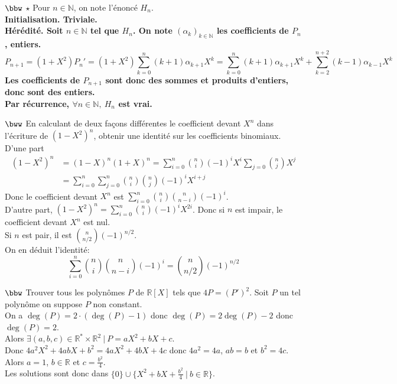 \documentclass[11pt]{article}
\begin{document}
\begin{exercice}{$\bbw$ $\star$}{}
     Pour $n\in\mathbb{N}$, on note l'énoncé $H_n$.\\
    \bf{Initialisation.} Triviale.\\
    \bf{Hérédité.} Soit $n\in\mathbb{N}$ tel que $H_n$. On note $(\alpha_k)_{k\in\mathbb{N}}$ les coefficients de $P_n$, entiers.
    \begin{equation*}P_{n+1}=(1+X^2)P_n'=(1+X^2)\sum\limits_{k=0}^{n}(k+1)\alpha_{k+1}X^{k}=\sum\limits_{k=0}^n(k+1)\alpha_{k+1}X^k+\sum\limits_{k=2}^{n+2}(k-1)\alpha_{k-1}X^{k}\end{equation*}
    Les coefficients de $P_{n+1}$ sont donc des sommes et produits d'entiers, donc sont des entiers.\\
    Par récurrence, $\forall{n\in\mathbb{N}}, ~ H_n$ est vrai.
\end{exercice}

\vspace*{-0.5cm}

\begin{exercice}{$\bww$}{}
    En calculant de deux façons différentes le coefficient devant $X^n$ dans l'écriture de $(1-X^2)^n$, obtenir une identité sur les coefficients binomiaux.
    \tcblower
    D'une part
    \begin{align*}
        (1-X^2)^n &= (1-X)^n(1+X)^n = \sum_{i=0}^n\binom{n}{i}(-1)^iX^i\sum_{j=0}\binom{n}{j}X^j\\
        &=\sum_{i=0}^n\sum_{j=0}^n\binom{n}{i}\binom{n}{j}(-1)^iX^{i+j}
    \end{align*}
    Donc le coefficient devant $X^n$ est $\sum_{i=0}^n\binom{n}{i}\binom{n}{n-i}(-1)^i$.\\
    D'autre part, $(1-X^2)^n=\sum_{i=0}^n\binom{n}{i}(-1)^iX^{2i}$. Donc si $n$ est impair, le coefficient devant $X^n$ est nul.\\
    Si $n$ est pair, il est $\binom{n}{n/2}(-1)^{n/2}$.\\
    On en déduit l'identité: 
    \begin{equation*}
        \sum_{i=0}^n\binom{n}{i}\binom{n}{n-i}(-1)^i=\binom{n}{n/2}(-1)^{n/2}
    \end{equation*}
\end{exercice}

\vspace*{-0.5cm}

\begin{exercice}{$\bbw$}{}
    Trouver tous les polynômes $P$ de $\mathbb{R}[X]$ tels que $4P=(P')^2$.
    \tcblower
    Soit $P$ un tel polynôme on suppose $P$ non constant.\\
    On a $\deg(P)=2\cdot(\deg(P)-1)$ donc $\deg(P)=2\deg(P)-2$ donc $\deg(P)=2$.\\
    Alors $\exists (a,b,c)\in\mathbb{R}^*\times\mathbb{R}^2 ~ | ~ P = aX^2 + bX + c$.\\
    Donc $4a^2X^2 + 4abX + b^2 = 4aX^2 + 4bX + 4c$ donc $4a^2=4a$, $ab = b$ et $b^2=4c$.\\
    Alors $a=1$, $b\in\mathbb{R}$ et $c=\frac{b^2}{4}$.\\
    Les solutions sont donc dans $\{0\}\cup\{X^2+bX+\frac{b^2}{4} ~ | ~ b\in\mathbb{R}\}$.
\end{exercice}
\end{document}
